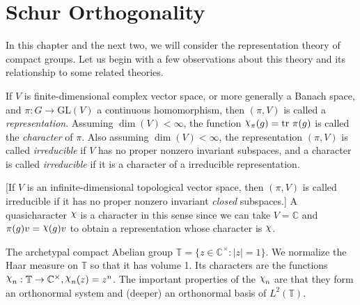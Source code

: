 \documentclass[12pt,reqno]{book}%
\theoremstyle{definition}
\theoremstyle{remark}
\theoremstyle{theorem}
\theoremstyle{remark}
\newcommand{\mychi}{\raisebox{2pt}{$\chi$}}
\begin{document}

\chapter{Schur Orthogonality}\label{}%
\vspace{5em}

In this chapter and the next two, we will consider the representation theory of compact groups.
Let us begin with a few observations about this theory and its relationship to some related theories.

If $V$ is finite-dimensional complex vector space, or more generally a Banach space, and $\pi : G \to \mathrm{GL}(V)$ a continuous homomorphism, then $(\pi, V)$ is called a \emph{representation}.
Assuming $\dim(V) < \infty$, the function $\mychi_\pi(g) = \tr \, \pi(g)$ is called the \emph{character} of $\pi$.
Also assuming $\dim(V) < \infty$, the representation $(\pi, V)$ is called \emph{irreducible} if $V$ has no proper nonzero invariant subspaces, and a character is called \emph{irreducible} if it is a character of a irreducible representation.

[If $V$ is an infinite-dimensional topological vector space, then $(\pi, V)$ is called irreducible if it has no proper nonzero invariant \emph{closed} subspaces.]
A quasicharacter $\mychi$ is a character in this sense since we can take $V = \mathbb{C}$ and $\pi(g)v = \mychi(g)v$ to obtain a representation whose character is $\mychi$.

The archetypal compact Abelian group $\mathbb{T} = \{z \in \mathbb{C}^{\times} : |z| = 1\}$.
We normalize the Haar measure on $\mathbb{T}$ so that it has volume 1.
Its characters are the functions $\mychi_n : \mathbb{T} \to \mathbb{C}^{\times}, \mychi_n(z) = z^n$.
The important properties of the $\mychi_n$ are that they form an orthonormal system and (deeper) an orthonormal basis of $L^2(\mathbb{T})$.
\end{document}
